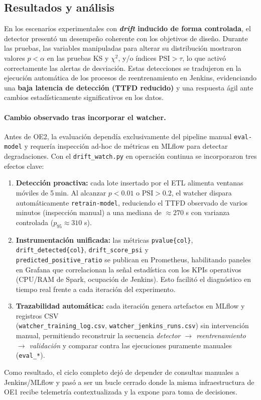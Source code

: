 \subsection{Resultados y análisis}

En los escenarios experimentales con \textbf{\textit{drift} inducido de forma controlada}, el detector presentó un desempeño coherente con los objetivos de diseño.  
Durante las pruebas, las variables manipuladas para alterar su distribución mostraron valores \(p < \alpha\) en las pruebas KS y $\chi^2$, y/o índices \(\mathrm{PSI} > \tau\), lo que activó correctamente las alertas de desviación.  
Estas detecciones se tradujeron en la ejecución automática de los procesos de reentrenamiento en Jenkins, evidenciando una \textbf{baja latencia de detección (TTFD reducido)} y una respuesta ágil ante cambios estadísticamente significativos en los datos.

\paragraph{Cambio observado tras incorporar el watcher.}
Antes de OE2, la evaluación dependía exclusivamente del pipeline manual \texttt{eval-model} y requería inspección ad-hoc de métricas en MLflow para detectar degradaciones. Con el \texttt{drift\_watch.py} en operación continua se incorporaron tres efectos clave:
\begin{enumerate}\setlength\itemsep{2pt}
  \item \textbf{Detección proactiva:} cada lote insertado por el ETL alimenta ventanas móviles de 5\,min. Al alcanzar \(p<0.01\) o \(\mathrm{PSI}>0.2\), el watcher dispara automáticamente \texttt{retrain-model}, reduciendo el TTFD observado de varios minutos (inspección manual) a una mediana de \(\approx 270\) s con varianza controlada (\(p_{95}\approx 310\) s).
  \item \textbf{Instrumentación unificada:} las métricas \texttt{pvalue\{col\}}, \texttt{drift\_detected\{col\}}, \texttt{drift\_score\_psi} y \\ \texttt{predicted\_positive\_ratio} se publican en Prometheus, habilitando paneles en Grafana que correlacionan la señal estadística con los KPIs operativos (CPU/RAM de Spark, ocupación de Jenkins). Esto facilitó el diagnóstico en tiempo real frente a cada iteración del experimento.
  \item \textbf{Trazabilidad automática:} cada iteración genera artefactos en MLflow y registros CSV \\ (\texttt{watcher\_training\_log.csv}, \texttt{watcher\_jenkins\_runs.csv}) sin intervención manual, permitiendo reconstruir la secuencia \textit{detector $\rightarrow$ reentrenamiento $\rightarrow$ validación} y comparar contra las ejecuciones puramente manuales (\texttt{eval\_*}).
\end{enumerate}
Como resultado, el ciclo completo dejó de depender de consultas manuales a Jenkins/MLflow y pasó a ser un bucle cerrado donde la misma infraestructura de OE1 recibe telemetría contextualizada y la expone para toma de decisiones.

